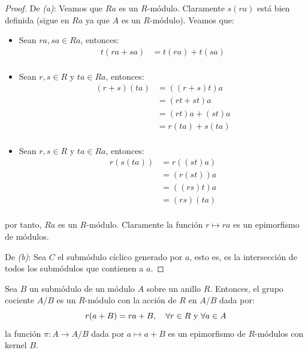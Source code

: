 \documentclass[12pt]{report}
\newcounter{it}
\theoremstyle{largebreak}
\newcommand\cf[3]{\ensuremath{#1:#2\rightarrow#3}}
\begin{document}
    \begin{proof}
        De \textit{(a)}: Veamos que $Ra$ es un $R$-módulo. Claramente $s(ra)$ está bien definida (sigue en $Ra$ ya que $A$ es un $R$-módulo). Veamos que:
        \begin{itemize}
            \item Sean $ra,sa\in Ra$, entonces:
            \begin{equation*}
                \begin{split}
                    t(ra+sa)&=t(ra)+t(sa)\\
                \end{split}
            \end{equation*}
            \item Sean $r,s\in R$ y $ta\in Ra$, entonces:
            \begin{equation*}
                \begin{split}
                    (r+s)(ta)&=((r+s)t)a\\
                    &=(rt+st)a\\
                    &=(rt)a+(st)a\\
                    &=r(ta)+s(ta)\\
                \end{split}
            \end{equation*}
            \item Sean $r,s\in R$ y $ta\in Ra$, entonces:
            \begin{equation*}
                \begin{split}
                    r(s(ta))&=r((st)a)\\
                    &=(r(st))a\\
                    &=((rs)t)a\\
                    &=(rs)(ta)\\
                \end{split}
            \end{equation*}
        \end{itemize}
        por tanto, $Ra$ es un $R$-módulo. Claramente la función $r\mapsto ra$ es un epimorfismo de módulos.

        De \textit{(b)}: Sea $C$ el submódulo cíclico generado por $a$, esto es, es la intersección de todos los submódulos que contienen a $a$.
    \end{proof}

    \begin{theor}
        Sea $B$ un submódulo de un módulo $A$ sobre un anillo $R$. Entonces, el grupo cociente $A/B$ es un $R$-módulo con la acción de $R$ en $A/B$ dada por:
        \begin{equation*}
            r(a+B)=ra+B,\quad\forall r\in R\textup{ y }\forall a\in A
        \end{equation*}
        la función $\cf{\pi}{A}{A/B}$ dada por $a\mapsto a+B$ es un epimorfismo de $R$-módulos con kernel $B$.
    \end{theor}
\end{document}

